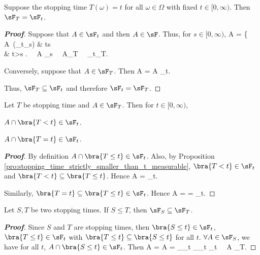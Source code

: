 \begin{proposition}
Suppose the stopping time $T(\omega)=t$ for all $\omega \in \Omega$ with fixed $t\in [0,\infty)$. Then $\sF_T = \sF_t$.
\end{proposition}

\begin{proof}[\bf Proof]
Suppose that $A\in \sF_t$ and then $A\in \sF$. Thus, for $s\in [0,\infty)$,
\be
A\cap {} = \left\{
A\ (\in \sF_t\subseteq \sF_s) \quad\quad & t\leq s \\
\emptyset & t>s
\ea\right. \ \ra\ A\cap {} \in \sF_s \ \ra\ A\in \sF_T \ \ra\ \sF_t\subseteq \sF_T.
\ee

Conversely, suppose that $A\in \sF_T$. Then
\be
A = A \cap {} \in \sF_t.
\ee

Thus, $\sF_T\subseteq \sF_t$ and therefore $\sF_t= \sF_T$.
\end{proof}


\begin{proposition}
Let $T$ be stopping time and $A\in \sF_T$. Then for $t\in [0,\infty)$,
\ben
\item [(i)] $A\cap \bra{T<t} \in \sF_t$.
\item [(ii)] $A\cap \bra{T=t}\in \sF_t$.
\een
\end{proposition}

\begin{proof}[\bf Proof]
\ben
\item [(i)] By definition $A\cap \bra{T\leq t} \in \sF_t$. Also, by Proposition \ref{pro:stopping_time_strictly_smaller_than_t_measurable}, $\bra{T<t}\in \sF_t$ and $\bra{T<t}\subseteq \bra{T\leq t}$. Hence
\be
A\cap {} = \cap {} \in \sF_t.
\ee

\item [(ii)] Similarly, $\bra{T=t} \subseteq \bra{T\leq t} \in \sF_t$. Hence
\be
A\cap {} =  \cap {} =  \cap {} \in \sF_t.
\ee
\een
\end{proof}

\begin{proposition}
Let $S,T$ be two stopping times. If $S\leq T$, then $\sF_S \subseteq \sF_T$.
\end{proposition}

\begin{proof}[\bf Proof]
Since $S$ and $T$ are stopping times, then $\bra{S \leq t}\in \sF_t$, $\bra{T \leq t}\in \sF_t$ with $\bra{T\leq t} \subseteq \bra{S\leq t}$ for all $t$. $\forall A \in \sF_S$, we have for all $t$, $A \cap \bra{S \leq t} \in \sF_t$. Then
\be
A \cap {} = A \cap {} = _{\in \sF_t} \cap {}_{\in \sF_t} \in \sF_t \ \ra \ A \in \sF_T.
\ee
\end{proof}


